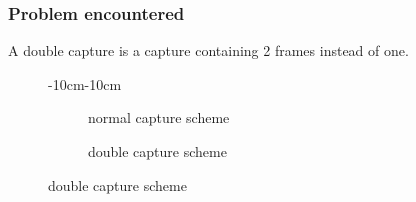 \begin{frame}
  \frametitle{Problem encountered}
  \begin{definition}
   A double capture is a capture containing 2 frames instead of one.
  \end{definition}
  \pause

  \begin{figure}[ht]
  \begin{adjustwidth}{-10cm}{-10cm}
    \centering
    \begin{subfigure}[ht]{0.47\textwidth}
      \centering
      
      \caption{normal capture scheme}
    \end{subfigure}
    \pause
    \begin{subfigure}[ht]{0.47\textwidth}
      \centering
      
      \caption{double capture scheme}
    \end{subfigure}
  \end{adjustwidth}
  \end{figure}
  

\end{frame}

